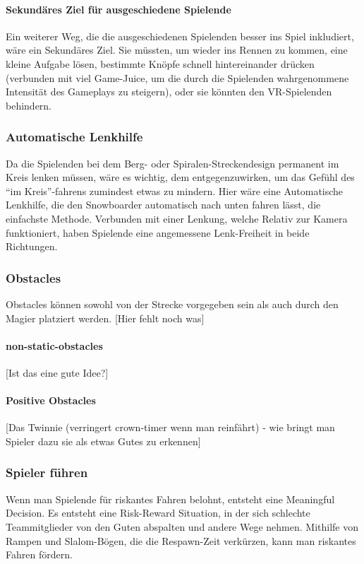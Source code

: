 \paragraph{Sekundäres Ziel für ausgeschiedene Spielende}
Ein weiterer Weg, die die ausgeschiedenen Spielenden besser ins Spiel inkludiert, wäre ein Sekundäres Ziel. Sie müssten, um wieder ins Rennen zu kommen, eine kleine Aufgabe lösen, bestimmte Knöpfe schnell hintereinander drücken (verbunden mit viel Game-Juice, um die durch die Spielenden wahrgenommene Intensität des Gameplays zu steigern), oder sie könnten den VR-Spielenden behindern.

\subsubsection{Automatische Lenkhilfe}
Da die Spielenden bei dem Berg- oder Spiralen-Streckendesign permanent im Kreis lenken müssen, wäre es wichtig, dem entgegenzuwirken, um das Gefühl des "`im Kreis"'-fahrens zumindest etwas zu mindern. Hier wäre eine Automatische Lenkhilfe, die den Snowboarder automatisch nach unten fahren lässt, die einfachste Methode. Verbunden mit einer Lenkung, welche Relativ zur Kamera funktioniert, haben Spielende eine angemessene Lenk-Freiheit in beide Richtungen.

\subsubsection{Obstacles}
Obstacles können sowohl von der Strecke vorgegeben sein als auch durch den Magier platziert werden.
[Hier fehlt noch was]

\paragraph{non-static-obstacles}
[Ist das eine gute Idee?]

\paragraph{Positive Obstacles}
[Das Twinnie (verringert crown-timer wenn man reinfährt) - wie bringt man Spieler dazu sie als etwas Gutes zu erkennen]

\subsubsection{Spieler führen}
Wenn man Spielende für riskantes Fahren belohnt, entsteht eine Meaningful Decision. Es entsteht eine Risk-Reward Situation, in der sich schlechte Teammitglieder von den Guten abspalten und andere Wege nehmen. Mithilfe von Rampen und Slalom-Bögen, die die Respawn-Zeit verkürzen, kann man riskantes Fahren fördern.

